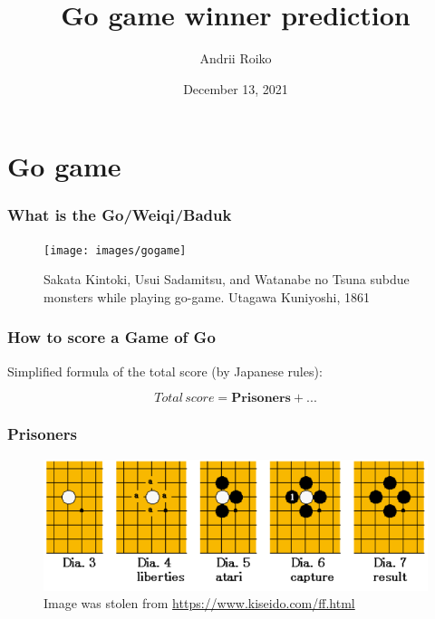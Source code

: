 \documentclass{beamer}
\title[InoXoft Bootcamp]{Go game winner prediction}
\author{Andrii Roiko}
\institute[] 
{
\textit{Data-Focused Programming Bootcamp} \\\textit{InoXoft} \\ 
\medskip
\textit{roykoand@gmail.com}  
}
\date{December 13, 2021} %
\begin{document}
\begin{frame}
\titlepage %
\end{frame}





\section{Go game}
\begin{frame}
\frametitle{What is the Go/Weiqi/Baduk}


\begin{figure}
	\centering
	\texttt{[image: images/gogame]} 
	\caption*{Sakata Kintoki, Usui Sadamitsu, and Watanabe no Tsuna subdue monsters while playing go-game. Utagawa Kuniyoshi, 1861}
\end{figure}

\end{frame}

\begin{frame}
\frametitle{How to score a Game of Go}

Simplified formula of the total score (by Japanese rules):

\[Total\, score = \textbf{Prisoners} + ...\]

\end{frame}

\begin{frame}
\frametitle{Prisoners}

\begin{figure}
	\centering
	\includegraphics[scale=0.75]{images/prisoners}
	\caption*{Image was stolen from \url{https://www.kiseido.com/ff.html}}
\end{figure}


\end{frame}
\end{document}
